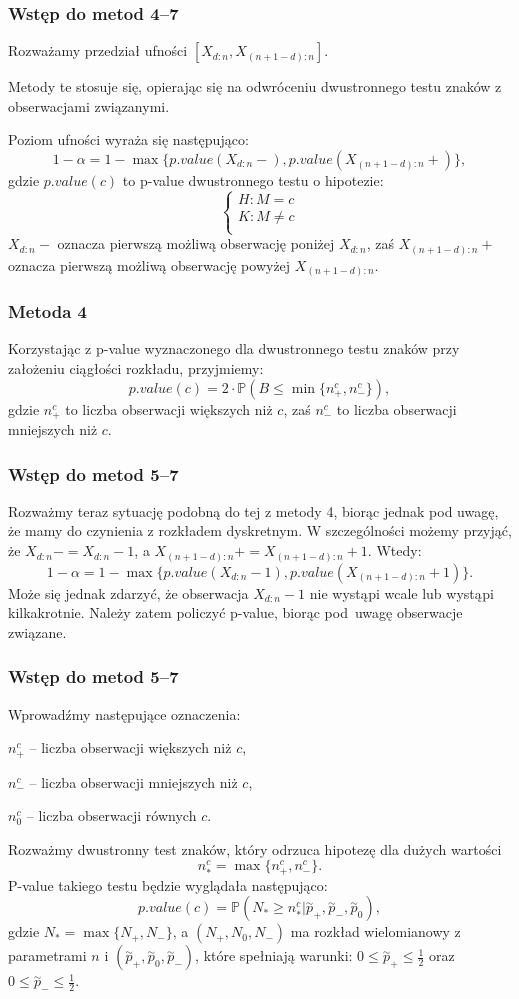 \documentclass[11pt,usenames,dvipsnames,svgnames,x11names]{beamer}
\theoremstyle{plain}
\theoremstyle{definition}
\theoremstyle{remark}
\begin{document}
\begin{frame}
\frametitle{Wstęp do metod 4--7}
Rozważamy przedział ufności $[X_{d:n},X_{(n+1-d):n}].$

Metody te stosuje się, opierając się na odwróceniu dwustronnego testu znaków z obserwacjami związanymi. 

Poziom ufności wyraża się następująco:
$$
1-\alpha = 1- \max{\lbrace p.value(X_{d:n}-), p.value(X_{(n+1-d):n}+) \rbrace},
$$
gdzie $p.value(c)$ to p-value dwustronnego testu o hipotezie:
$$
\left\{
\begin{array}{l}
H: M=c \\
K: M\neq c \\
\end{array}
\right.
$$
$X_{d:n}-$ oznacza pierwszą możliwą obserwację poniżej $X_{d:n}$, zaś $X_{(n+1-d):n}+$ oznacza pierwszą możliwą obserwację powyżej $X_{(n+1-d):n}$.
\end{frame}

\begin{frame}
\frametitle{Metoda 4}
Korzystając z p-value wyznaczonego dla dwustronnego testu znaków przy założeniu ciągłości rozkładu, przyjmiemy:
$$
p.value(c) = 2\cdot\mathbb{P}(B\leq \min{\lbrace n_+^c,n_-^c\rbrace}),
$$
gdzie $n_+^c$ to liczba obserwacji większych niż $c$, zaś $n_-^c$ to liczba obserwacji mniejszych niż $c$.
\end{frame}

\begin{frame}
\frametitle{Wstęp do metod 5--7}
Rozważmy teraz sytuację podobną do tej z metody 4, biorąc jednak pod uwagę, że mamy do czynienia z rozkładem dyskretnym. W szczególności możemy przyjąć, że $X_{d:n}- = X_{d:n}-1$, a $X_{(n+1-d):n}+ = X_{(n+1-d):n}+1$. Wtedy:
$$
1-\alpha = 1- \max{\lbrace p.value(X_{d:n}-1), p.value(X_{(n+1-d):n}+1) \rbrace}.
$$
Może się jednak zdarzyć, że obserwacja $X_{d:n}-1$ nie wystąpi wcale lub wystąpi kilkakrotnie. Należy zatem policzyć p-value, biorąc pod~uwagę obserwacje związane.  
\end{frame}

\begin{frame}
\frametitle{Wstęp do metod 5--7}
Wprowadźmy następujące oznaczenia:

$n_+^c$ -- liczba obserwacji większych niż $c$,

$n_-^c$ -- liczba obserwacji mniejszych niż $c$,

$n_0^c$ -- liczba obserwacji równych $c$.

\bigskip

Rozważmy dwustronny test znaków, który odrzuca hipotezę dla dużych wartości
$$
n_*^c = \max{\lbrace n_+^c,n_-^c \rbrace}.
$$
P-value takiego testu będzie wyglądała następująco:
$$
p.value(c) = \mathbb{P}(N_*\geq n_*^c | \stackrel{\sim}{p}_+,\stackrel{\sim}{p}_-,\stackrel{\sim}{p}_0),
$$
gdzie $N_* = \max{\lbrace N_+,N_- \rbrace}$, a $(N_+,N_0,N_-)$ ma rozkład wielomianowy z parametrami $n$ i $(\stackrel{\sim}{p}_+,\stackrel{\sim}{p}_0,\stackrel{\sim}{p}_-)$, które spełniają warunki:
$ 0 \leq  \stackrel{\sim}{p}_+ \leq \frac{1}{2}$ oraz $ 0 \leq  \stackrel{\sim}{p}_- \leq \frac{1}{2}$.
\end{frame}
\end{document}
